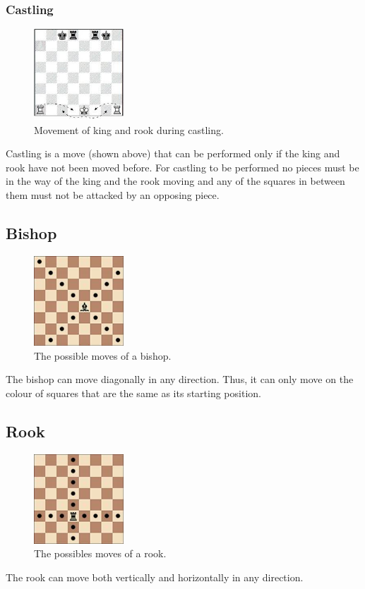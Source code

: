 \subsubsection{Castling}
\begin{figure}[H]
\centering
	\includegraphics[width=0.3\textwidth]{images/boards/castling}
	\caption{Movement of king and rook during castling.}
\end{figure}
Castling is a move (shown above) that can be performed only if the king and rook have not been moved before. For castling to be performed no pieces must be in the way of the king and the rook moving and any of the squares in between them must not be attacked by an opposing piece.
\subsection{Bishop}
\begin{figure}[H]
\centering
	\includegraphics[width=0.3\textwidth]{images/boards/bishop_movement}
	\caption{The possible moves of a bishop.}
\end{figure}
The bishop can move diagonally in any direction. Thus, it can only move on the colour of squares that are the same as its starting position.	
\subsection{Rook}
\begin{figure}[H]
\centering
	\includegraphics[width=0.3\textwidth]{images/boards/rook_movement}
	\caption{The possibles moves of a rook.}
\end{figure}
The rook can move both vertically and horizontally in any direction.
